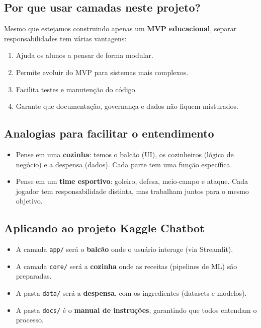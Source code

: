 \documentclass[12pt,a4paper]{article}
\begin{document}
\subsection{Por que usar camadas neste projeto?}

Mesmo que estejamos construindo apenas um \textbf{MVP educacional}, separar responsabilidades tem várias vantagens:

\begin{enumerate}
  \item Ajuda os alunos a pensar de forma modular.
  \item Permite evoluir do MVP para sistemas mais complexos.
  \item Facilita testes e manutenção do código.
  \item Garante que documentação, governança e dados não fiquem misturados.
\end{enumerate}

\subsection{Analogias para facilitar o entendimento}

\begin{itemize}
  \item Pense em uma \textbf{cozinha}: temos o balcão (UI), os cozinheiros (lógica de negócio) e a despensa (dados). Cada parte tem uma função específica.
  \item Pense em um \textbf{time esportivo}: goleiro, defesa, meio-campo e ataque. Cada jogador tem responsabilidade distinta, mas trabalham juntos para o mesmo objetivo.
\end{itemize}

\subsection{Aplicando ao projeto Kaggle Chatbot}

\begin{itemize}
  \item A camada \texttt{app/} será o \textbf{balcão} onde o usuário interage (via Streamlit).
  \item A camada \texttt{core/} será a \textbf{cozinha} onde as receitas (pipelines de ML) são preparadas.
  \item A pasta \texttt{data/} será a \textbf{despensa}, com os ingredientes (datasets e modelos).
  \item A pasta \texttt{docs/} é o \textbf{manual de instruções}, garantindo que todos entendam o processo.
\end{itemize}
\end{document}
